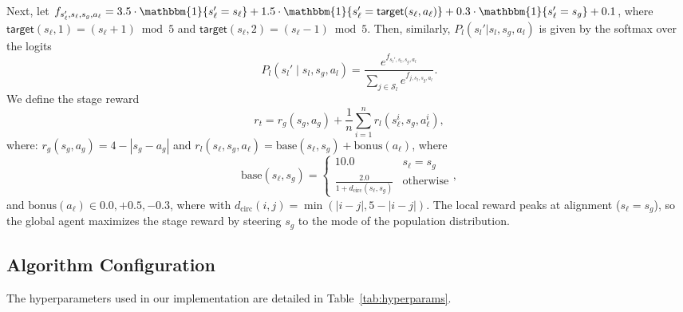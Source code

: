 \documentclass{article}
\theoremstyle{plain}
\theoremstyle{definition}
\begin{document}
Next, let
$f_{s_\ell',s_\ell,s_g,a_\ell} = 3.5 \cdot \mathbbm{1}\{s_\ell' = s_\ell\} + 1.5 \cdot \mathbbm{1}\{s_\ell' = \mathsf{target}(s_\ell, a_\ell)\} + 0.3 \cdot \mathbbm{1}\{s_\ell' = s_g\} + 0.1$, where $\mathsf{target}(s_\ell, 1) = (s_\ell + 1) \bmod 5$ and $\mathsf{target}(s_\ell, 2) = (s_\ell - 1) \bmod 5$.  Then, similarly, $P_l(s_l'|s_l,s_g,a_l)$ is given by the softmax over the logits \[P_l(s_l' \mid s_l, s_g, a_l) = \frac{e^{f_{s_l',s_l, s_g, a_l}}}{\sum_{j\in\mathcal{S}_l} e^{f_{j,s_l,s_g, a_l}}}.\]
We define the stage reward
\begin{equation}r_t = r_g(s_g, a_g) + \frac{1}{n}\sum_{i=1}^n r_l(s_\ell^i, s_g, a_\ell^i),\end{equation}
where: 
$r_g(s_g, a_g) = 4 - |s_g - a_g|$ and
$r_l(s_\ell, s_g, a_\ell) = \text{base}(s_\ell, s_g) + \text{bonus}(a_\ell)$, where
$$\text{base}(s_\ell, s_g) = \begin{cases} 10.0 &  s_\ell = s_g \\ 
\frac{2.0}{1 + d_{\text{circ}}(s_\ell, s_g)} & \text{otherwise} \end{cases},$$
and $\text{bonus}(a_\ell) \in {0.0, +0.5, -0.3}$, where
with $d_{\text{circ}}(i,j) = \min(|i-j|, 5-|i-j|)$. The local reward peaks at alignment ($s_\ell = s_g$), so the global agent maximizes the stage reward by steering $s_g$ to the mode of the population distribution.


\subsection{Algorithm Configuration}
The hyperparameters used in our implementation are detailed in Table~\ref{tab:hyperparams}.
\end{document}

